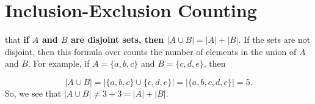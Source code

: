 \chapter{Inclusion-Exclusion Counting}\label{ch:Inclusion-Exclusion Counting}

%
%


 that {\bfseries if $A$ and $B$ are disjoint sets, then
$|A\cup B|= |A| +|B|$}. If the sets are not disjoint, then this formula over counts the number
of elements in the union of $A$ and $B$. For example, if $A=\{a,b,c\}$ and $B=\{c,d,e\}$,
then 

$$
\lvert A\cup B \rvert =\lvert \{a,b,c\}\cup\{c,d,e\} \rvert= \vert \{a,b,c,d,e\} \rvert = 5.
$$
So, we see that $\lvert A\cup B \rvert\not=3+3 = \lvert A \rvert + \lvert B \rvert$. 


